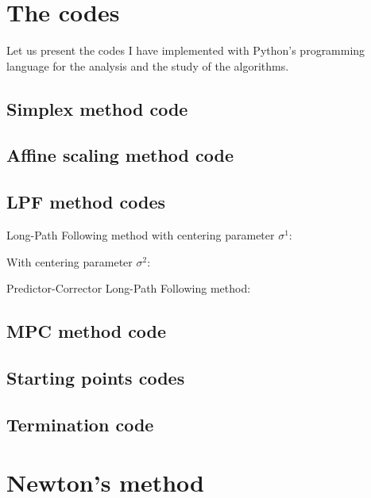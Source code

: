 \documentclass[a4paper,10 pt,titlepage,twoside]{report}
\theoremstyle{plain}
\theoremstyle{definition}
\theoremstyle{remark}
\begin{document}
{{\chapter{The codes}	
 Let us present the codes I have implemented with Python's programming language for the analysis and the study of the algorithms.
 \section{Simplex method code}\label{app:A.1}
 
 \section{Affine scaling method code}
 
 \section{LPF method codes}
 Long-Path Following method with centering parameter $\sigma^{1}$:
 
With centering parameter $\sigma^{2}$:
 
Predictor-Corrector Long-Path Following method: 
 
\section{MPC method code}

\newpage
\section{Starting points codes}
 
 
\section{Termination code}
 
	\chapter{Newton's method}
}}
\end{document}
